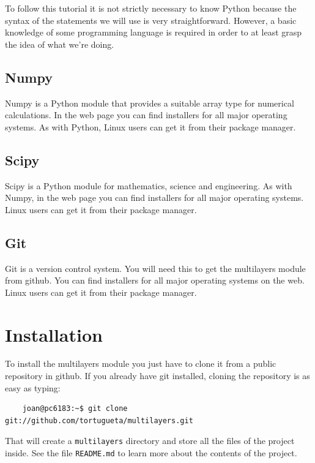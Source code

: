 \documentclass[a4paper,11pt,aps,final]{revtex4}
\begin{document}
To follow this tutorial it is not strictly necessary to know \textsf{Python} because the syntax of the statements we will use is very straightforward. However, a basic knowledge of some programming language is required in order to at least grasp the idea of what we're doing.

\subsection{\textsf{Numpy}}
\textsf{Numpy} is a \textsf{Python} module that provides a suitable array type for numerical calculations. In the web page\cite{numpy} you can find installers for all major operating systems. As with \textsf{Python}, Linux users can get it from their package manager.

\subsection{\textsf{Scipy}}
\textsf{Scipy} is a \textsf{Python} module for mathematics, science and engineering. As with \textsf{Numpy}, in the web page\cite{scipy} you can find installers for all major operating systems. Linux users can get it from their package manager.

\subsection{\textsf{Git}}
\textsf{Git} is a version control system. You will need this to get the \textsf{multilayers} module from \textsf{github}\cite{github}. You can find installers for all major operating systems on the web\cite{git}. Linux users can get it from their package manager.

\section{Installation}
To install the multilayers module you just have to clone it from a public repository in \textsf{github}\cite{github}. If you already have git installed, cloning the repository is as easy as typing:
\begin{verbatim}
    joan@pc6183:~$ git clone git://github.com/tortugueta/multilayers.git
\end{verbatim}

That will create a \texttt{multilayers} directory and store all the files of the project inside. See the file \texttt{README.md} to learn more about the contents of the project.
\end{document}
